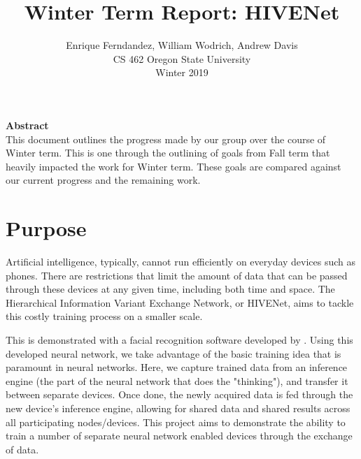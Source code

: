 \documentclass[onecolumn, draftclsnofoot,10pt, compsoc]{IEEEtran}
\title{Winter Term Report: HIVENet}
\author{Enrique Ferndandez, William Wodrich, Andrew Davis\\CS 462 Oregon State University\\Winter 2019}
\begin{document}
\pagestyle{plain}

\begin{titlepage}
	\maketitle

	\pagestyle{plain}

	\noindent
	\textbf{Abstract} \\
    This document outlines the progress made by our group over the course of Winter term. This is one through the outlining of goals from Fall term that heavily impacted the work for Winter term. These goals are compared against our current progress and the remaining work.

	\indent


\end{titlepage}

\newpage
\tableofcontents
\newpage
\section{Purpose}
Artificial intelligence, typically, cannot run efficiently on everyday devices such as phones.
There are restrictions that limit the amount of data that can be passed through these devices at any given time, including both time and space.
The Hierarchical Information Variant Exchange Network, or HIVENet, aims to tackle this costly training process on a smaller scale.

This is demonstrated with a facial recognition software developed by \cite{google}. 
Using this developed neural network, we take advantage of the basic training idea that is paramount in neural networks.
Here, we capture trained data from an inference engine (the part of the neural network that does the "thinking"), and transfer it between separate devices.
Once done, the newly acquired data is fed through the new device's inference engine, allowing for shared data and shared results across all participating nodes/devices.
This project aims to demonstrate the ability to train a number of separate neural network enabled devices through the exchange of data.
\end{document}
